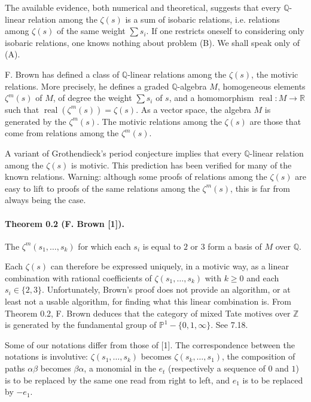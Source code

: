 \documentclass[11pt]{article}
\newcommand{\Q}{\mathbb Q}
\newcommand{\Z}{\mathbb Z}
\newcommand{\R}{\mathbb R}
\newcommand{\PP}{\mathbb P}
\newcommand{\real}{\operatorname{real}}
\begin{document}
The available evidence, both numerical and theoretical, suggests that every $\Q$-linear relation among the $\zeta(s)$ is a sum of isobaric relations, i.e. relations among $\zeta(s)$ of the same weight $\sum s_i$.
If one restricts oneself to considering only isobaric relations, one knows nothing about problem (B).
We shall speak only of (A).

F. Brown has defined a class of $\Q$-linear relations among the $\zeta(s)$, the motivic relations.
More precisely, he defines a graded $\Q$-algebra $M$, homogeneous elements $\zeta^m(s)$ of $M$, of degree the weight $\sum s_i$ of $s$, and a homomorphism $\real:M\to\R$ such that $\real(\zeta^m(s))=\zeta(s)$.
As a vector space, the algebra $M$ is generated by the $\zeta^m(s)$.
The motivic relations among the $\zeta(s)$ are those that come from relations among the $\zeta^m(s)$.

A variant of Grothendieck's period conjecture implies that every $\Q$-linear relation among the $\zeta(s)$ is motivic.
This prediction has been verified for many of the known relations.
Warning: although some proofs of relations among the $\zeta(s)$ are easy to lift to proofs of the same relations among the $\zeta^m(s)$, this is far from always being the case.

\paragraph{Theorem 0.2 (F. Brown [1]).}
The $\zeta^m(s_1,\ldots,s_k)$ for which each $s_i$ is equal to $2$ or $3$ form a basis of $M$ over $\Q$.

Each $\zeta(s)$ can therefore be expressed uniquely, in a motivic way, as a linear combination with rational coefficients of $\zeta(s_1,\ldots,s_k)$ with $k\geq 0$ and each $s_i\in\{2,3\}$.
Unfortunately, Brown's proof does not provide an algorithm, or at least not a usable algorithm, for finding what this linear combination is.
From Theorem 0.2, F. Brown deduces that the category of mixed Tate motives over $\Z$ is generated by the fundamental group of $\PP^1-\{0,1,\infty\}$. See 7.18.

Some of our notations differ from those of [1].
The correspondence between the notations is involutive: $\zeta(s_1,\ldots,s_k)$ becomes $\zeta(s_k,\ldots,s_1)$, the composition of paths $\alpha\beta$ becomes $\beta\alpha$, a monomial in the $e_t$ (respectively a sequence of $0$ and $1$) is to be replaced by the same one read from right to left, and $e_1$ is to be replaced by $-e_1$.
\end{document}
